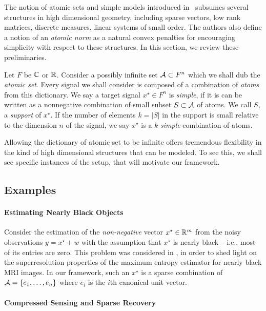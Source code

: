 The notion of atomic sets and simple models introduced in~\cite{crpw} subsumes
several structures in high dimensional geometry, including sparse
vectors, low rank matrices, discrete measures, linear systems of small order.
The authors also define a notion of an \emph{atomic norm} as a natural convex
penalties for encouraging simplicity with respect to these structures. In this
section, we review these preliminaries.

Let $F$ be $\mathbb{C}$ or $\mathbb{R}$. Consider a possibly infinite set $\mathcal{A} \subset F^n$
which we shall dub the \emph{atomic set}. Every signal we shall consider is
composed of a combination of \emph{atoms} from this dictionary. We say a target
signal $x^\star \in F^n$ is \emph{simple}, if it is can be written as a
nonnegative combination of small subset $S \subset \mathcal{A}$ of atoms. We call $S$, a
\emph{support} of $x^\star$. If the number of elements $k = |S|$ in the support
is small relative to the dimension $n$ of the signal, we say $x^\star$ is a $k$
\emph{simple} combination of atoms.

Allowing the dictionary of atomic set to be infinite offers tremendous
flexibility in the kind of high dimensional structures that can be modeled. To
see this, we shall see specific instances of the setup, that will motivate our
framework.

\subsection{Examples}

\paragraph{Estimating Nearly Black Objects}

Consider the estimation of the \emph{non-negative} vector $x^\star \in \mathbb{R}^m$
from the noisy observations $y = x^\star + w$ with the assumption that $x^\star$
is nearly black -- i.e., most of its entries are zero. This problem was
considered in \cite{DonohoNearlyBlack92,JohnstoneSparse94}, in order to shed
light on the superresolution properties of the maximum entropy estimator for
nearly black MRI images. In our framework, such an $x^\star$ is a sparse
combination of $\mathcal{A} = \{ e_1, \dots, e_n\}$ where $e_i$ is the $i$th canonical
unit vector.

\paragraph{Compressed Sensing and Sparse Recovery}

